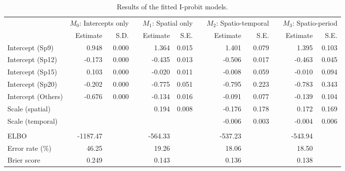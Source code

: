 \documentclass[a4paper,showframe,11pt]{report}\usepackage[]{graphicx}\usepackage[]{color}
\begin{document}
\begin{table}
\caption{\label{tab:table.btb}Results of the fitted I-probit models.}
\centering
\begin{tabular}[t]{lrrrrrrrrrrr}
\toprule
\multicolumn{1}{c}{ } & \multicolumn{2}{r}{$M_0$: Intercepts only} & \multicolumn{1}{c}{ } & \multicolumn{2}{r}{$M_1$: Spatial only} & \multicolumn{1}{c}{ } & \multicolumn{2}{r}{$M_2$: Spatio-temporal} & \multicolumn{1}{c}{ } & \multicolumn{2}{r}{$M_3$: Spatio-period} \\
\cmidrule(l{2pt}r{2pt}){2-3} \cmidrule(l{2pt}r{2pt}){5-6} \cmidrule(l{2pt}r{2pt}){8-9} \cmidrule(l{2pt}r{2pt}){11-12}
  & Estimate & S.D. &   & Estimate & S.E. &   & Estimate & S.E. &   & Estimate & S.E.\\
\midrule
Intercept (Sp9) & 0.948 & 0.000 &  & 1.364 & 0.015 &  & 1.401 & 0.079 &  & 1.395 & 0.103\\
Intercept (Sp12) & -0.173 & 0.000 &  & -0.435 & 0.013 &  & -0.506 & 0.017 &  & -0.463 & 0.045\\
Intercept (Sp15) & 0.103 & 0.000 &  & -0.020 & 0.011 &  & -0.008 & 0.059 &  & -0.010 & 0.094\\
Intercept (Sp20) & -0.202 & 0.000 &  & -0.775 & 0.051 &  & -0.795 & 0.223 &  & -0.783 & 0.343\\
Intercept (Others) & -0.676 & 0.000 &  & -0.134 & 0.016 &  & -0.091 & 0.077 &  & -0.139 & 0.104\\[0.5em]
Scale (spatial) &  &  &  & 0.194 & 0.008 &  & -0.176 & 0.178 &  & 0.172 & 0.169\\
Scale (temporal) &  &  &  &  &  &  & -0.006 & 0.003 &  & -0.004 & 0.006\\
\\
ELBO & -1187.47 &  &  & -564.33 &  &  & -537.23 &  &  & -543.94 & \\
Error rate (\%) & 46.25 &  &  & 19.26 &  &  & 18.06 &  &  & 18.50 & \\
Brier score & 0.249 &  &  & 0.143 &  &  & 0.136 &  &  & 0.138 & \\
\bottomrule
\end{tabular}
\end{table}
\end{document}
